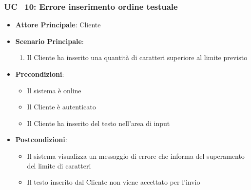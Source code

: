 \subsubsection{UC\_10: Errore inserimento ordine testuale}
\label{uc_10}

\begin{itemize}
    \item \textbf{Attore Principale}: Cliente
	 \item \textbf{Scenario Principale}:
    \begin{enumerate}
        \item Il Cliente ha inserito una quantità di caratteri superiore al limite previsto
    \end{enumerate}
   \item \textbf{Precondizioni}:
		\begin{itemize}
			\item Il sistema è online
			\item Il Cliente è autenticato
			\item Il Cliente ha inserito del testo nell'area di input
		\end{itemize}
	\item \textbf{Postcondizioni}:
	\begin{itemize}
		\item Il sistema visualizza un messaggio di errore che informa del superamento del limite di caratteri
		\item Il testo inserito dal Cliente non viene accettato per l'invio
	\end{itemize}
\end{itemize}